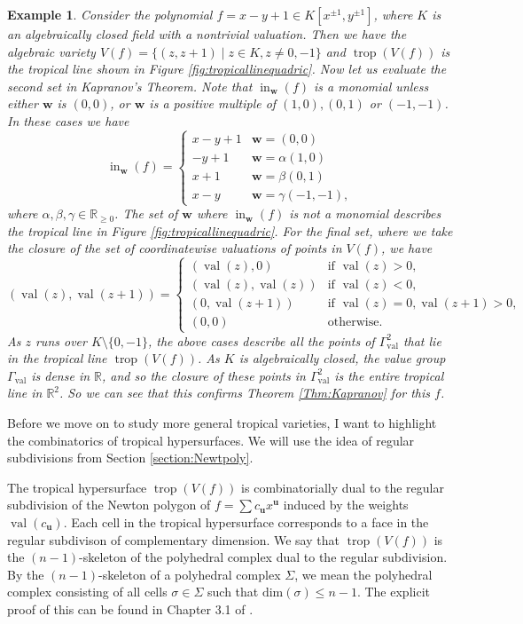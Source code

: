 \documentclass[11pt,reqno,a4paper]{article}
\theoremstyle{theoremstyle}
\theoremstyle{examplestyle}
\newtheorem{example}[theorem]{Example}
\theoremstyle{algorithmstyle}
\numberwithin{equation}{subsection}
\newcommand{\RR}{\mathbb{R}}
\DeclareMathOperator{\trop}{trop}
\DeclareMathOperator{\val}{val}
\DeclareMathOperator{\initial}{in}
\begin{document}
\begin{example}
    Consider the polynomial $f = x - y +1 \in K[x^{\pm1},y^{\pm1}]$, where $K$ is an algebraically closed field with a nontrivial valuation. Then we have the algebraic variety $V(f) = \{(z,z+1) \; | \; z\in K, z \neq 0 , -1\}$ and $\trop(V(f))$ is the tropical line shown in Figure \ref{fig:tropicallinequadric}.
    Now let us evaluate the second set in Kapranov's Theorem. Note that $\initial_\mathbf{w}(f)$ is a monomial unless either $\mathbf{w}$ is $(0,0)$, or $\mathbf{w}$ is a positive multiple of $(1,0), (0,1)$ or $(-1,-1)$. In these cases we have
    \[\initial_\mathbf{w}(f) = 
    \begin{cases}
        x-y+1 & \mathbf{w} = (0,0) \\
        -y+1 & \mathbf{w} = \alpha(1,0) \\
        x+1 & \mathbf{w} = \beta(0,1) \\
        x-y & \mathbf{w} = \gamma(-1,-1),
    \end{cases}\] where  $\alpha, \beta, \gamma \in \RR_{\geq0}$. The set of $\mathbf{w}$ where $\initial_\mathbf{w}(f)$ is not a monomial describes the tropical line in Figure \ref{fig:tropicallinequadric}. For the final set, where we take the closure of the set of coordinatewise valuations of points in $V(f)$, we have
    \[
        \left( \val(z), \val(z+1) \right) =
        \begin{cases}
        (\val(z), 0) & \text{if } \val(z) > 0, \\
        (\val(z), \val(z)) & \text{if } \val(z) < 0, \\
        (0, \val(z+1)) & \text{if } \val(z) = 0, \val(z+1) > 0, \\
        (0, 0) & \text{otherwise}.
        \end{cases} \]
    As $z$ runs over $K\setminus\{0,-1\}$, the above cases describe all the points of $\Gamma_{\val}^2$ that lie in the tropical line $\trop(V(f))$. As $K$ is algebraically closed, the value group $\Gamma_{\val}$ is dense in $\RR$, and so the closure of these points in $\Gamma_{\val}^2$ is the entire tropical line in $\RR^2$. So we can see that this confirms Theorem \ref{Thm:Kapranov} for this $f$.
\end{example}

Before we move on to study more general tropical varieties, I want to highlight the combinatorics of tropical hypersurfaces. We will use the idea of regular subdivisions from Section \ref{section:Newtpoly}.

The tropical hypersurface $\trop(V(f))$ is combinatorially dual to the regular subdivision of the Newton polygon of $f = \sum c_\textbf{u}x^{\textbf{u}}$ induced by the weights $\val(c_\textbf{u})$. Each cell in the tropical hypersurface corresponds to a face in the regular subdivison of complementary dimension. We say that $\trop(V(f))$ is the $(n-1)$-skeleton of the polyhedral complex dual to the regular subdivision. By the $(n-1)$-skeleton of a polyhedral complex $\Sigma$, we mean the polyhedral complex consisting of all cells $\sigma \in \Sigma$ such that $\text{dim}(\sigma) \leq n-1$. The explicit proof of this can be found in Chapter 3.1 of \cite{MS2015}.
\end{document}

